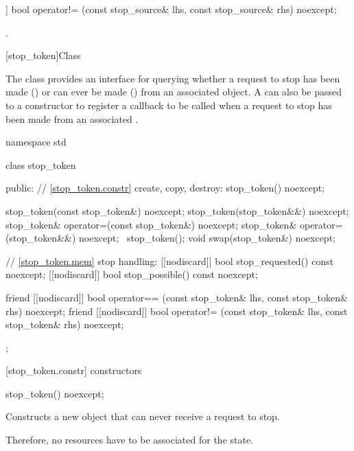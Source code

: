 {%
\begin{itemdecl}
[[nodiscard]] bool operator!= (const stop_source& lhs, const stop_source& rhs) noexcept;
\end{itemdecl}
\begin{itemdescr}
  \pnum\returns {}.
\end{itemdescr}


%
[stop_token]{Class }

\pnum
{}%
The class  provides an interface for querying whether
a request to stop has been made () or can ever be made
() from an associated  object.
A  can also be passed to a  constructor
to register a callback to be called when a request to stop has been made from
an associated . 

\begin{codeblock}
namespace std {
  class stop_token {
  public:
    // \ref{stop_token.constr} create, copy, destroy:
    stop_token() noexcept;

    stop_token(const stop_token&) noexcept;
    stop_token(stop_token&&) noexcept;
    stop_token& operator=(const stop_token&) noexcept;
    stop_token& operator=(stop_token&&) noexcept;
    ~stop_token();
    void swap(stop_token&) noexcept;

    // \ref{stop_token.mem} stop handling:
    [[nodiscard]] bool stop_requested() const noexcept;
    [[nodiscard]] bool stop_possible() const noexcept;

    friend [[nodiscard]] bool operator== (const stop_token& lhs, const stop_token& rhs) noexcept;
    friend [[nodiscard]] bool operator!= (const stop_token& lhs, const stop_token& rhs) noexcept;
  };
}
\end{codeblock}


[stop_token.constr]{ constructors}

%
\begin{itemdecl}
stop_token() noexcept;
\end{itemdecl}
\begin{itemdescr}
  \pnum\effects Constructs a new  object that can never receive a request to stop.
                \begin{note} Therefore, no resources have to be associated for the state. \end{note}


\end{itemdescr}}
